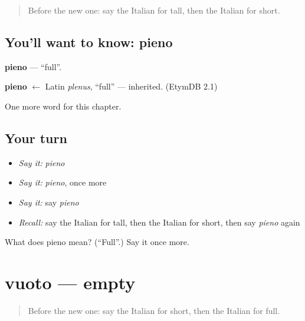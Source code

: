 \label{lesson:IT-C75-pieno}



\begin{quote}
Before the new one: say the Italian for tall, then the Italian for short.
\end{quote}

\subsection*{You'll want to know: pieno}
\textbf{pieno} — \textquotedblleft{}full\textquotedblright{}.

\begin{cousinweb}
\textbf{pieno} $\leftarrow$ Latin \emph{plenus}, \textquotedblleft{}full\textquotedblright{} — inherited. (EtymDB 2.1)
\end{cousinweb}

\begin{grammarlens}[title={What you've built}]
One more word for this chapter.
\end{grammarlens}

\subsection*{Your turn}
\begin{itemize}
\raggedright
  \item \emph{Say it:} \emph{pieno}
  \item \emph{Say it:} \emph{pieno}, once more
  \item \emph{Say it:} say \emph{pieno}
  \item \emph{Recall:} say the Italian for tall, then the Italian for short, then say \emph{pieno} again
\end{itemize}

\begin{tcolorbox}[breakable,colback=teal!4,colframe=teal!35!black,title={Before you move on}]
What does pieno mean? (\textquotedblleft{}Full\textquotedblright{}.) Say it once more.
\end{tcolorbox}
\section[vuoto]{vuoto — empty}

\label{lesson:IT-C75-vuoto}



\begin{quote}
Before the new one: say the Italian for short, then the Italian for full.
\end{quote}

